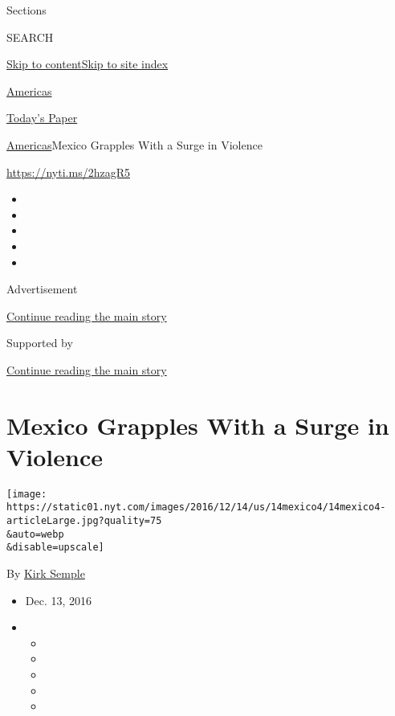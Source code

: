 Sections

SEARCH

\protect\hyperlink{site-content}{Skip to
content}\protect\hyperlink{site-index}{Skip to site index}

\href{https://www.nytimes.com/section/world/americas}{Americas}

\href{https://myaccount.nytimes.com/auth/login?response_type=cookie\&client_id=vi}{}

\href{https://www.nytimes.com/section/todayspaper}{Today's Paper}

\href{/section/world/americas}{Americas}\textbar{}Mexico Grapples With a
Surge in Violence

\url{https://nyti.ms/2hzagR5}

\begin{itemize}
\item
\item
\item
\item
\item
\end{itemize}

Advertisement

\protect\hyperlink{after-top}{Continue reading the main story}

Supported by

\protect\hyperlink{after-sponsor}{Continue reading the main story}

\hypertarget{mexico-grapples-with-a-surge-in-violence}{%
\section{Mexico Grapples With a Surge in
Violence}\label{mexico-grapples-with-a-surge-in-violence}}

\texttt{[image: https://static01.nyt.com/images/2016/12/14/us/14mexico4/14mexico4-articleLarge.jpg?quality=75\\\&auto=webp\\\&disable=upscale]}

By \href{http://www.nytimes.com/by/kirk-semple}{Kirk Semple}

\begin{itemize}
\item
  Dec. 13, 2016
\item
  \begin{itemize}
  \item
  \item
  \item
  \item
  \item
  \end{itemize}
\end{itemize}

